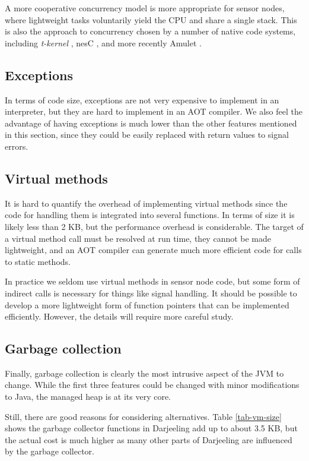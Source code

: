 A more cooperative concurrency model is more appropriate for sensor nodes, where lightweight tasks voluntarily yield the CPU and share a single stack. This is also the approach to concurrency chosen by a number of native code systems, including \emph{t-kernel} \cite{Gu:2005un}, nesC \cite{Gay:2003up}, and more recently Amulet \cite{Hester:2016je}.


\subsection{Exceptions}
In terms of code size, exceptions are not very expensive to implement in an interpreter, but they are hard to implement in an AOT compiler. We also feel the advantage of having exceptions is much lower than the other features mentioned in this section, since they could be easily replaced with return values to signal errors.


\subsection{Virtual methods}
It is hard to quantify the overhead of implementing virtual methods since the code for handling them is integrated into several functions. In terms of size it is likely less than 2 KB, but the performance overhead is considerable. The target of a virtual method call must be resolved at run time, they cannot be made lightweight, and an AOT compiler can generate much more efficient code for calls to static methods.

In practice we seldom use virtual methods in sensor node code, but some form of indirect calls is necessary for things like signal handling. It should be possible to develop a more lightweight form of function pointers that can be implemented efficiently. However, the details will require more careful study.


\subsection{Garbage collection}
Finally, garbage collection is clearly the most intrusive aspect of the JVM to change. While the first three features could be changed with minor modifications to Java, the managed heap is at its very core.

Still, there are good reasons for considering alternatives. Table \ref{tab-vm-size} shows the garbage collector functions in Darjeeling add up to about 3.5 KB, but the actual cost is much higher as many other parts of Darjeeling are influenced by the garbage collector.

